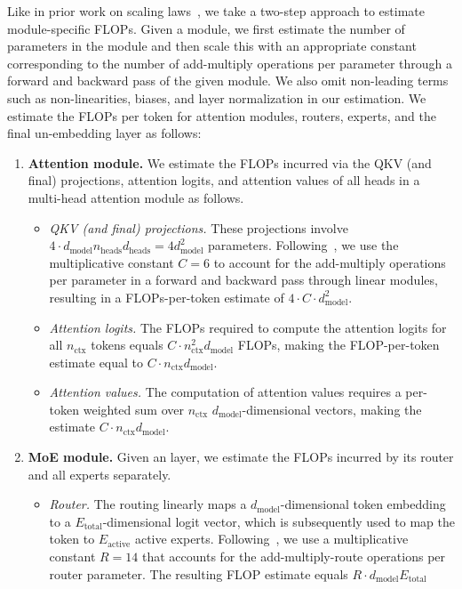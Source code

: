 Like in prior work on scaling laws~\citep{kaplan_scale,hoffmann2022training}, we take a two-step approach to estimate module-specific FLOPs. 
Given a module, we first estimate the number of parameters in the module and then scale this with an appropriate constant corresponding to the number of add-multiply operations per parameter through a forward and backward pass of the given module.  
We also omit non-leading terms such as non-linearities, biases, and layer normalization in our estimation. We estimate the FLOPs per token for attention modules, \moe routers, \moe experts, and the final un-embedding layer as follows:
\begin{enumerate}[left=10pt,itemsep=2pt]
    \item \textbf{Attention module.} We estimate the FLOPs incurred via the QKV (and final) projections, attention logits, and attention values of all heads in a multi-head attention module as follows.
    \begin{itemize}
        \item \emph{QKV (and final) projections.} These projections involve $4 \cdot d_{\text{model}} n_{\text{heads}} d_{\text{heads}} = 4 d^2_{\text{model}}$ parameters. Following~\citet{kaplan_scale}, we use the multiplicative constant $C=6$ to account for the add-multiply operations per parameter in a forward and backward pass through linear modules, resulting in a FLOPs-per-token estimate of $4 \cdot C \cdot d^2_{\text{model}}$. 
        \item \emph{Attention logits.} The FLOPs required to compute the attention logits for all $n_{\text{ctx}}$ tokens equals $C \cdot n^2_{\text{ctx}} d_{\text{model}}$ FLOPs, making the FLOP-per-token estimate equal to $C \cdot n_{\text{ctx}} d_{\text{model}}$. 
        \item \emph{Attention values.} The computation of attention values requires a per-token weighted sum over $n_{\text{ctx}}$ $d_{\text{model}}$-dimensional vectors, making the estimate $C \cdot n_{\text{ctx}} d_{\text{model}}$.
    \end{itemize}
    \item \textbf{MoE module.} Given an \moe layer, we estimate the FLOPs incurred by its router and all experts separately. 
    \begin{itemize}
        \item \emph{Router.} The \moe routing linearly maps a $d_{\text{model}}$-dimensional token embedding to a $E_{\text{total}}$-dimensional logit vector, which is subsequently used to map the token to $E_{\text{active}}$ active experts. Following~\citet{ludziejewski2024scaling}, we use a multiplicative constant $R=14$ that accounts for the add-multiply-route operations per router parameter. The resulting FLOP estimate equals $R \cdot d_{\text{model}} E_{\text{total}}$  

\end{itemize}
\end{enumerate}
